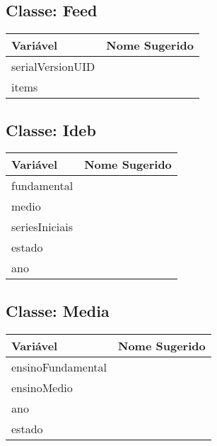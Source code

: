 \documentclass[12pt]{article}
\begin{document}
	\subsection{Classe: Feed}
		\begin{table}[H]
			\begin{center}
				\begin{tabular}{l | l}
					\toprule
						Variável & Nome Sugerido\\
					\midrule
						serialVersionUID & \\
						items & \\
					\bottomrule
				\end{tabular}
			\end{center}
		\end{table}

	\subsection{Classe: Ideb}
		\begin{table}[H]
			\begin{center}
				\begin{tabular}{l | l}
					\toprule
						Variável & Nome Sugerido\\
					\midrule
						fundamental & \\
						medio & \\
						seriesIniciais & \\
						estado & \\
						ano & \\
					\bottomrule
				\end{tabular}
			\end{center}
		\end{table}

	\subsection{Classe: Media}
		\begin{table}[H]
			\begin{center}
				\begin{tabular}{l | l}
					\toprule
						Variável & Nome Sugerido\\
					\midrule
						ensinoFundamental & \\
						ensinoMedio & \\
						ano & \\
						estado & \\
					\bottomrule
				\end{tabular}
			\end{center}
		\end{table}
\end{document}
